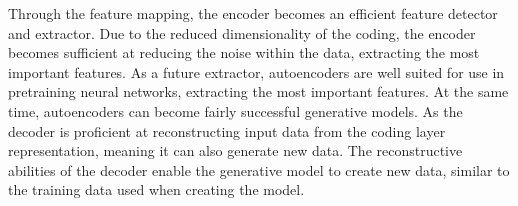 Through the feature mapping, the encoder becomes an efficient feature detector and extractor.
Due to the reduced dimensionality of the coding, the encoder becomes sufficient at reducing the noise within the data, extracting the most important features.
As a future extractor, autoencoders are well suited for use in pretraining neural networks, extracting the most important features.
At the same time, autoencoders can become fairly successful generative models.
As the decoder is proficient at reconstructing input data from the coding layer representation, meaning it can also generate new data.
The reconstructive abilities of the decoder enable the generative model to create new data, similar to the training data used when creating the model.
\cite[p.~506-508]{Geron2017}
